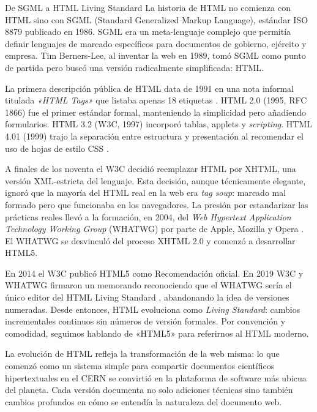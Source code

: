 \begin{cajahistoria}{De SGML a HTML Living Standard}
La historia de HTML no comienza con HTML sino con SGML (Standard
Generalized Markup Language), estándar ISO 8879 publicado en 1986.
SGML era un meta-lenguaje complejo que permitía definir lenguajes de
marcado específicos para documentos de gobierno, ejército y empresa.
Tim Berners-Lee, al inventar la web en 1989, tomó SGML como punto de
partida pero buscó una versión radicalmente simplificada: HTML.

La primera descripción pública de HTML data de 1991 en una nota
informal titulada \emph{«HTML Tags»} que listaba apenas 18 etiquetas
\cite{bernerslee1991htmltags}. HTML 2.0 (1995, RFC 1866) fue el
primer estándar formal, manteniendo la simplicidad pero añadiendo
formularios. HTML 3.2 (W3C, 1997) incorporó tablas, applets y
\emph{scripting}. HTML 4.01 (1999) trajo la separación entre
estructura y presentación al recomendar el uso de hojas de estilo
CSS \cite{raggett1999html401}.

A finales de los noventa el W3C decidió reemplazar HTML por XHTML,
una versión XML-estricta del lenguaje. Esta decisión, aunque
técnicamente elegante, ignoró que la mayoría del HTML real en la web
era \emph{tag soup}: marcado mal formado pero que funcionaba en los
navegadores. La presión por estandarizar las prácticas reales llevó a
la formación, en 2004, del \emph{Web Hypertext Application Technology
Working Group} (WHATWG) por parte de Apple, Mozilla y Opera
\cite{hickson2004whatwg}. El WHATWG se desvinculó del proceso XHTML
2.0 y comenzó a desarrollar HTML5.

En 2014 el W3C publicó HTML5 como Recomendación oficial. En 2019
W3C y WHATWG firmaron un memorando reconociendo que el WHATWG sería
el único editor del HTML Living Standard
\cite{whatwgw3c2019memorandum}, abandonando la idea de versiones
numeradas. Desde entonces, HTML evoluciona como \emph{Living
Standard}: cambios incrementales continuos sin números de versión
formales. Por convención y comodidad, seguimos hablando de «HTML5»
para referirnos al HTML moderno.
\end{cajahistoria}

La evolución de HTML refleja la transformación de la web misma: lo
que comenzó como un sistema simple para compartir documentos
científicos hipertextuales en el CERN se convirtió en la plataforma
de software más ubicua del planeta. Cada versión documenta no solo
adiciones técnicas sino también cambios profundos en cómo se entendía
la naturaleza del documento web.

